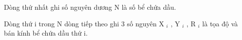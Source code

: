 Dòng thứ nhất ghi số nguyên dương N là số bể chứa dầu.  

   Dòng thứ i trong N dòng tiếp theo ghi 3 số nguyên X   $_    i   $   , Y   $_    i   $   , R   $_    i   $   là tọa độ và bán kính bể chứa dầu thứ i.